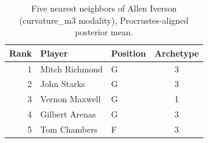 \begin{table}[htbp]
  \centering\small
  \begin{tabular}{rllc}
    \toprule
    Rank & Player & Position & Archetype \\
    \midrule
    1 & Mitch Richmond & G & 3 \\
    2 & John Starks & G & 3 \\
    3 & Vernon Maxwell & G & 1 \\
    4 & Gilbert Arenas & G & 3 \\
    5 & Tom Chambers & F & 3 \\
    \bottomrule
  \end{tabular}
  \caption{Five nearest neighbors of Allen Iverson (curvature_m3 modality), Procrustes-aligned posterior mean.}
  \label{tab:Allen_Iverson_neighbors_curvature_m3}
\end{table}

